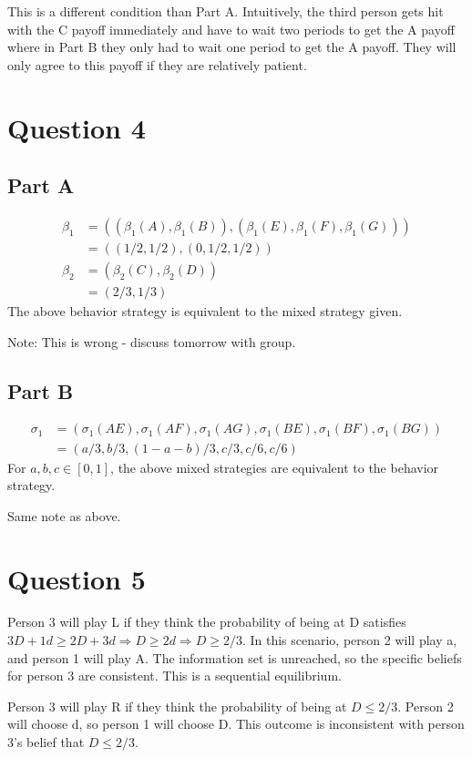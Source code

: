 \documentclass[11pt]{article} %
\begin{document}
This is a different condition than Part A. Intuitively, the third person gets hit with the C payoff immediately and have to wait two periods to get the A payoff where in Part B they only had to wait one period to get the A payoff. They will only agree to this payoff if they are relatively patient.
\section{Question 4}
\subsection{Part A}
\begin{align*}
\beta_1 &= \left((\beta_1(A),\beta_1(B)),(\beta_1(E),\beta_1(F),\beta_1(G))\right)\\
&= ((1/2,1/2),(0,1/2,1/2))\\
\beta_2 &= (\beta_2(C),\beta_2(D))\\
&= (2/3,1/3)
\end{align*}
The above behavior strategy is equivalent to the mixed strategy given.

Note: This is wrong - discuss tomorrow with group.
\subsection{Part B}
\begin{align*}
\sigma_1 &= \left(\sigma_1(AE),\sigma_1(AF),\sigma_1(AG),\sigma_1(BE),\sigma_1(BF),\sigma_1(BG) \right) \\
&= (a/3,b/3,(1-a-b)/3,c/3,c/6,c/6)
\end{align*}
For $a,b,c \in [0,1]$, the above mixed strategies are equivalent to the behavior strategy.

Same note as above.
\section{Question 5}

Person 3 will play L if they think the probability of being at D satisfies $3D + 1d \geq 2D + 3d \Rightarrow D\geq 2d \Rightarrow D \geq 2/3$. In this scenario, person 2 will play a, and person 1 will play A. The information set is unreached, so the specific beliefs for person 3 are consistent. This is a sequential equilibrium.

Person 3 will play R if they think the probability of being at $D\leq 2/3$. Person 2 will choose d, so person 1 will choose D. This outcome is inconsistent with person 3's belief that $D\leq 2/3$.
\end{document}
